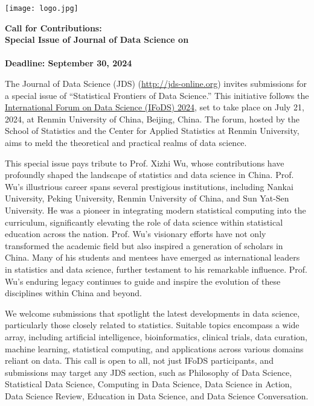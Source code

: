 \documentclass[12pt]{article}
\begin{document}
\pagestyle{empty}


\noindent
\begin{minipage}[m]{1.74in}
\texttt{[image: logo.jpg]}
\end{minipage}
\hfill
\begin{minipage}[m]{5in}
\begin{center}
  {\color{dukeblue}
    {\bf\LARGE Call for Contributions:}}\\[1ex]
  {\bf\large Special Issue of Journal of Data Science on}\\[1ex]
  {\color{dukeblue}{\bf\large  Statistical Frontiers of Data Science}\\[1ex]
  {\bf Deadline: September 30, 2024}}
\end{center}
\end{minipage}

\bigskip

The Journal of Data Science (JDS) (\url{http://jds-online.org})
invites submissions for a special issue of ``Statistical Frontiers of
Data Science.''  This initiative follows the
\href{https://statds.org/events/ifods2024}{International Forum on Data
  Science (IFoDS) 2024}, set to take place on July 21, 2024, at
Renmin University of China, Beijing, China. The forum, hosted by the
School of Statistics and the Center for Applied Statistics at Renmin
University, aims to meld the theoretical and practical realms of data
science.


This special issue pays tribute to Prof. Xizhi Wu, whose contributions
have profoundly shaped the landscape of statistics and data science in
China. Prof. Wu's illustrious career spans several prestigious institutions,
including Nankai
University, Peking University, Renmin University of China, and Sun
Yat-Sen University. He was a pioneer in integrating modern statistical
computing into the curriculum, significantly elevating the role of
data science within statistical education across the
nation. Prof. Wu's visionary efforts have not only transformed the
academic field but also inspired a generation of scholars in
China. Many of his students and mentees have emerged as international
leaders in statistics and data science, further testament to his
remarkable influence. Prof. Wu's enduring legacy continues to guide
and inspire the evolution of these disciplines within China and
beyond.


We welcome submissions that spotlight the latest developments in data
science, particularly those closely related to statistics. Suitable
topics encompass a wide array, including artificial intelligence,
bioinformatics, clinical trials, data curation, machine learning,
statistical computing, and applications across various domains reliant
on data. This call is open to all, not just IFoDS participants, and
submissions may target any JDS section, such as Philosophy of Data
Science, Statistical Data Science, Computing in Data Science, Data
Science in Action, Data Science Review, Education in Data Science, and
Data Science Conversation.
\end{document}
